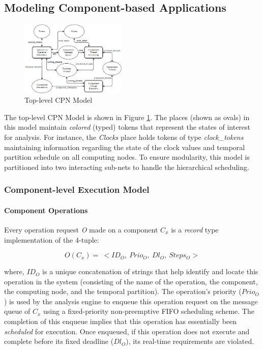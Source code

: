 \subsection{Modeling Component-based Applications}

\begin{figure}[htb]
	\centering
	\includegraphics[width=0.45\textwidth]{figs/HL_CPN.png}
	\caption{Top-level CPN Model}
	\label{fig:hl_cpn}
\end{figure}

The top-level CPN Model is shown in Figure \ref{fig:hl_cpn}. The places (shown as ovals) in this model maintain \emph{colored} (typed) tokens that represent the states of interest for analysis. For instance, the \emph{Clocks} place holds tokens of type \emph{clock\_tokens} maintaining information regarding the state of the clock values and temporal partition schedule on all computing nodes. To ensure modularity, this model is partitioned into two interacting sub-nets to handle the hierarchical scheduling.

\subsubsection{Component-level Execution Model}

\paragraph{Component Operations} Every operation request \emph{O} made on a component \emph{$C_x$} is a \emph{record} type implementation of the 4-tuple:

\vspace{-0.15in}
\begin{equation}
O(C_x) = \ < ID_O, \ Prio_O, \ Dl_O, \  Steps_O >
\end{equation}

where, $ID_O$ is a unique concatenation of strings that help identify and locate this operation in the system (consisting of the name of the operation, the component, the computing node, and the temporal partition). The operation's priority ($Prio_O$) is used by the analysis engine to enqueue this operation request on the message queue of $C_x$ using a fixed-priority non-preemptive FIFO scheduling scheme. The completion of this enqueue implies that this operation has essentially been \emph{scheduled} for execution. Once enqueued, if this operation does not execute and complete before its fixed deadline ($Dl_O$), its real-time requirements are violated. 

